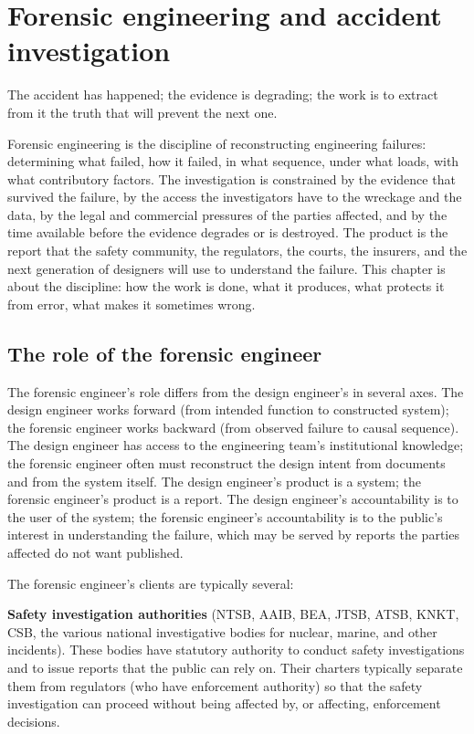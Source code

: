 \chapter{Forensic engineering and accident investigation}
\label{vol10:ch12}

\epigraph{The accident has happened; the evidence is degrading; the work is to extract from it the truth that will prevent the next one.}{}


\noindent
Forensic engineering is the discipline of reconstructing engineering failures: determining what failed, how it failed, in what sequence, under what loads, with what contributory factors. The investigation is constrained by the evidence that survived the failure, by the access the investigators have to the wreckage and the data, by the legal and commercial pressures of the parties affected, and by the time available before the evidence degrades or is destroyed. The product is the report that the safety community, the regulators, the courts, the insurers, and the next generation of designers will use to understand the failure. This chapter is about the discipline: how the work is done, what it produces, what protects it from error, what makes it sometimes wrong.

\section{The role of the forensic engineer}

The forensic engineer's role differs from the design engineer's in several axes. The design engineer works forward (from intended function to constructed system); the forensic engineer works backward (from observed failure to causal sequence). The design engineer has access to the engineering team's institutional knowledge; the forensic engineer often must reconstruct the design intent from documents and from the system itself. The design engineer's product is a system; the forensic engineer's product is a report. The design engineer's accountability is to the user of the system; the forensic engineer's accountability is to the public's interest in understanding the failure, which may be served by reports the parties affected do not want published.

The forensic engineer's clients are typically several:

\textbf{Safety investigation authorities} (NTSB, AAIB, BEA, JTSB, ATSB, KNKT, CSB, the various national investigative bodies for nuclear, marine, and other incidents). These bodies have statutory authority to conduct safety investigations and to issue reports that the public can rely on. Their charters typically separate them from regulators (who have enforcement authority) so that the safety investigation can proceed without being affected by, or affecting, enforcement decisions.


